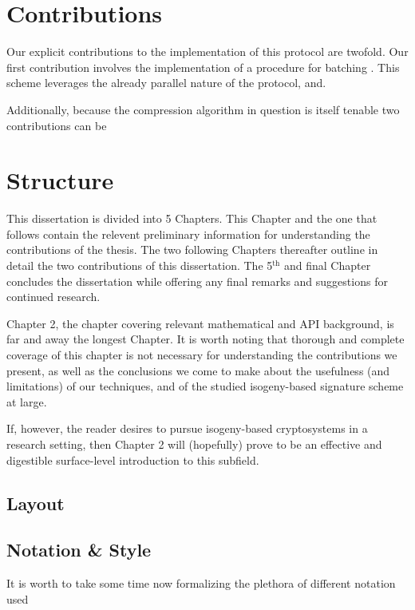 \section{Contributions}

Our explicit contributions to the implementation of this protocol are twofold. Our first contribution involves the implementation of a procedure for batching . This scheme leverages the already parallel nature of the protocol, and.

Additionally, because the compression algorithm in question is itself tenable two contributions can be 


\section{Structure}

This dissertation is divided into 5 Chapters. This Chapter and the one that follows contain the relevent preliminary information for understanding the contributions of the thesis. The two following Chapters thereafter outline in detail the two contributions of this dissertation. The 5$^{\text{th}}$ and final Chapter concludes the dissertation while offering any final remarks and suggestions for continued research.

Chapter 2, the chapter covering relevant mathematical and API background, is far and away the longest Chapter. It is worth noting that thorough and complete coverage of this chapter is not necessary for understanding the contributions we present, as well as the conclusions we come to make about the usefulness (and limitations) of our techniques, and of the studied isogeny-based signature scheme at large.

If, however, the reader desires to pursue isogeny-based cryptosystems in a research setting, then Chapter 2 will (hopefully) prove to be an effective and digestible surface-level introduction to this subfield.  

\subsection{Layout}


\subsection{Notation \& Style}

It is worth to take some time now formalizing the plethora of different notation used\\

